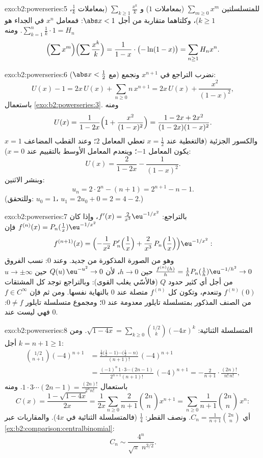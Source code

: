 \begin{solution}{exo:b2:powerseries:5}
 للمتسلسلتين $\sum_{m \geq 0} x^m$ (بمعاملات $1$) و
$\sum_{k\geq1} \frac{x^k}{k}$ (بمعاملات $\frac1k$، $k \geq
1$)، وكلتاهما متقاربة  من أجل $\abs x < 1$: فمعامل
$x^n$ في الجداء هو $\sum_{k=1}^{n} \frac1k \cdot 1 = H_n$.
ومنه
\[
\Bigl(\sum x^m\Bigr)\Bigl(\sum \frac{x^k}{k}\Bigr)
= \frac{1}{1-x}\cdot\bigl(-\ln(1-x)\bigr)
= \sum_{n\geq1} H_n x^n .
\]
\end{solution}

\begin{solution}{exo:b2:powerseries:6}
نضرب التراجع في $x^{n+1}$ ونجمع (مع $\abs x <
\frac12$):
\[
U(x) - 1 = 2x\,U(x) + \sum_{n\geq0} n\,x^{n+1}
= 2x\,U(x) + \frac{x^2}{(1-x)^2} ,
\]
باستعمال \cref{exo:b2:powerseries:3}. ومنه
\[
U(x) = \frac{1}{1 - 2x}\Bigl(1 + \frac{x^2}{(1-x)^2}\Bigr)
= \frac{1 - 2x + 2x^2}{(1-2x)(1-x)^2} .
\]
والكسور الجزئية (فالتغطية عند $x = \frac12$ تعطي المعامل $2$؛
وعند القطب المضاعف $x = 1$ يكون المعامل $-1$؛ وينعدم المعامل
الأوسط بالتقييم عند $x = 0$):
\[
U(x) = \frac{2}{1-2x} - \frac{1}{(1 - x)^2} .
\]
وبنشر الاثنين:
\[
u_n = 2\cdot 2^n - (n + 1) = 2^{n+1} - n - 1 .
\]
(وللتحقق: $u_0 = 1$، $u_1 = 2u_0 + 0 = 2 = 4 - 2$.)
\end{solution}

\begin{solution}{exo:b2:powerseries:7}
بالتراجع: $f'(x) = \frac{2}{x^3}\eu^{-1/x^2}$، وإذا كان $f^{(n)}(x)
= P_n(\tfrac1x)\eu^{-1/x^2}$ فإن
\[
f^{(n+1)}(x) =
\Bigl(-\frac{1}{x^2}\,P_n'\Bigl(\frac1x\Bigr) +
\frac{2}{x^3}\,P_n\Bigl(\frac1x\Bigr)\Bigr)\eu^{-1/x^2} :
\]
وهو من الصورة المذكورة من جديد. وعند $0$: نسب الفروق $\frac{f^{(n)}(h)}{h} =
\frac1h P_n(\frac1h)\eu^{-1/h^2} \to 0$ حين $h \to 0$، لأن
$Q(u)\,\eu^{-u^2} \to 0$ حين $u \to \pm\infty$ من أجل أي كثير حدود
$Q$ (فالأسّي يغلب القوى): وبالتراجع توجد كل المشتقات $f^{(n)}(0)$
وتنعدم، وتكون كل $f^{(n)}$ متصلة عند $0$ بالنهاية
نفسها. ومن ثم فإن $f \in C^\infty$ من الصنف المذكور بمتسلسلة تايلور معدومة عند $0$؛ ومجموع
متسلسلة تايلور $0 \neq f$: فهي ليست  عند $0$.
\end{solution}

\begin{solution}{exo:b2:powerseries:8}
المتسلسلة الثنائية: $\sqrt{1-4x} = \sum_{k\geq0}
\binom{1/2}{k}(-4x)^k$. ومن أجل $k = n + 1 \geq 1$:
\begin{align*}
\binom{1/2}{n+1}(-4)^{n+1}
&= \frac{\frac12\bigl(\frac12 - 1\bigr)\cdots\bigl(\frac12 -
n\bigr)}{(n+1)!}\,(-4)^{n+1}\\
&= \frac{(-1)^n\,1\cdot3\cdots(2n-1)}{2^{n+1}(n+1)!}\,(-4)^{n+1}
= -\frac{2}{n+1}\cdot\frac{(2n)!}{n!\,n!} ,
\end{align*}
باستعمال $1\cdot3\cdots(2n-1) = \frac{(2n)!}{2^n n!}$. ومنه
\[
C(x) = \frac{1 - \sqrt{1-4x}}{2x}
= \frac{1}{2x}\sum_{n\geq0}\frac{2}{n+1}\binom{2n}{n}x^{n+1}
= \sum_{n\geq0} \frac{1}{n+1}\binom{2n}{n}\,x^n :
\]
أي $C_n = \frac{1}{n+1}\binom{2n}{n}$. ونصف القطر: $\frac14$ (فالمتسلسلة
الثنائية في $4x$). والمقاربات عبر
\cref{ex:b2:comparison:centralbinomial}:
\[
C_n \sim \frac{4^n}{\sqrt{\pi}\; n^{3/2}} .
\]
\end{solution}

